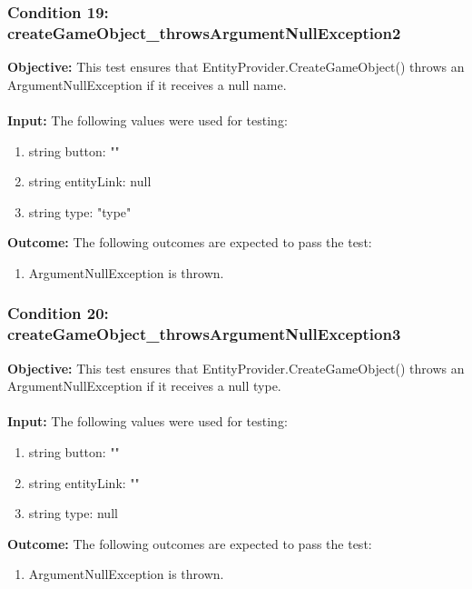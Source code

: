 \documentclass[a4paper,12pt]{article}
\begin{document}
		\subsubsection{Condition 19: createGameObject\_throwsArgumentNullException2}
			\textbf{Objective:} This test ensures that EntityProvider.CreateGameObject() throws an ArgumentNullException if it receives a null name.\\\\
			\textbf{Input:} The following values were used for testing:
				\begin{enumerate}
					\item string button: ""
					\item string entityLink: null
					\item string type: "type"
				\end{enumerate}
			\textbf{Outcome:} The following outcomes are expected to pass the test:
				\begin{enumerate}
					\item ArgumentNullException is thrown.
				\end{enumerate}
		\subsubsection{Condition 20: createGameObject\_throwsArgumentNullException3}
			\textbf{Objective:} This test ensures that EntityProvider.CreateGameObject() throws an ArgumentNullException if it receives a null type.\\\\
			\textbf{Input:} The following values were used for testing:
				\begin{enumerate}
					\item string button: ""
					\item string entityLink: ""
					\item string type: null
				\end{enumerate}
			\textbf{Outcome:} The following outcomes are expected to pass the test:
				\begin{enumerate}
					\item ArgumentNullException is thrown.
				\end{enumerate}
\end{document}

